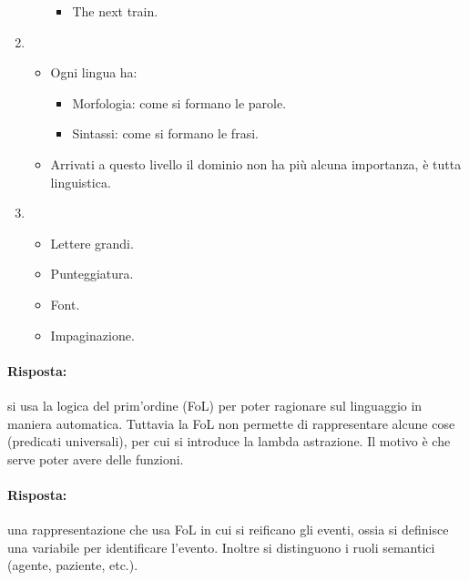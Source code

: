 \begin{enumerate}
\begin{itemize}
\begin{itemize}
          \item The next train.
        \end{itemize}
    \end{itemize}
  \item {}
    \begin{itemize}
      \item Ogni lingua ha: 
        \begin{itemize}
          \item Morfologia: come si formano le parole. 
          \item Sintassi: come si formano le frasi.
        \end{itemize}
      \item Arrivati a questo livello il dominio non ha più alcuna importanza, è tutta linguistica.
    \end{itemize}
  \item {} 
    \begin{itemize}
      \item Lettere grandi. 
      \item Punteggiatura. 
      \item Font. 
      \item Impaginazione.
    \end{itemize}
\end{enumerate}



\paragraph{Risposta:} si usa la logica del prim'ordine (FoL) per poter ragionare sul linguaggio in maniera automatica. Tuttavia la FoL non permette di rappresentare alcune cose (predicati universali), per cui si introduce la lambda astrazione. Il motivo è che serve poter avere delle funzioni.



\paragraph{Risposta:} una rappresentazione che usa FoL in cui si reificano gli eventi, ossia si definisce una variabile per identificare l'evento. Inoltre si distinguono i ruoli semantici (agente, paziente, etc.).

